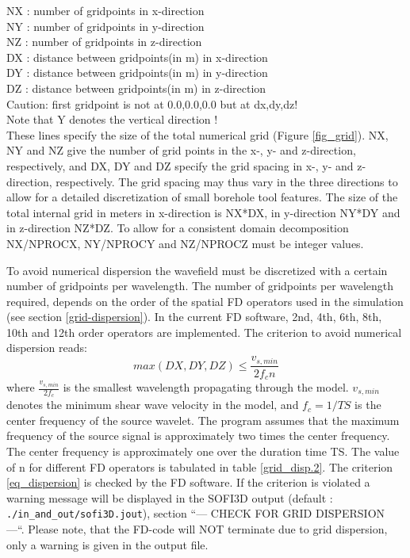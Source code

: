 \documentclass[11pt,onecolumn,oneside]{article}
\begin{document}
NX : number of gridpoints in x-direction\\
NY : number of gridpoints in y-direction\\
NZ : number of gridpoints in z-direction\\
DX : distance between gridpoints(in m) in x-direction\\
DY : distance between gridpoints(in m) in y-direction\\
DZ : distance between gridpoints(in m) in z-direction\\
Caution: first gridpoint is not at {0.0,0.0,0.0} but at {dx,dy,dz}!\\
Note that Y denotes the vertical direction !\\


These lines specify the size of the total numerical grid (Figure  \ref{fig_grid}). NX, NY and NZ give the number of grid points in the x-, y- and z-direction, respectively, and DX, DY and DZ
specify the grid spacing in x-, y- and z-direction, respectively. The grid spacing may thus vary in the three directions to allow for a detailed discretization of small borehole tool features.
The size of the total internal grid in meters in x-direction is NX*DX, in y-direction NY*DY  and in z-direction NZ*DZ. To allow for a consistent domain decomposition NX/NPROCX, NY/NPROCY and NZ/NPROCZ must be integer values.

To avoid numerical dispersion the wavefield must be discretized with a certain number of gridpoints per wavelength. The number of gridpoints per wavelength required, depends on the order of the spatial
FD operators used in the simulation (see section \ref{grid-dispersion}). In the current FD software, 2nd, 4th, 6th, 8th, 10th and 12th order operators are implemented. The criterion to avoid numerical dispersion reads:
\begin{equation}
max(DX,DY,DZ)\le\frac{v_{s,min}}{2 f_c n} \label{eq_dispersion}
\end{equation}
where $\frac{v_{s,min}}{2 f_c}$ is the smallest wavelength propagating through the model. $v_{s,min}$ denotes the minimum shear wave velocity in the model, and $f_c=1/TS$ is the center frequency of the source wavelet. The program assumes that the maximum frequency of the source signal is approximately two times the center frequency. The center frequency is approximately one over the duration time TS. The value of n for different FD operators is tabulated in table \ref{grid_disp.2}. The criterion \ref{eq_dispersion} is checked by the FD software. If the criterion is violated a warning message will be displayed in the SOFI3D output (default :  \lstinline{./in_and_out/sofi3D.jout}), section ``--- CHECK FOR GRID DISPERSION ---``. Please note, that the FD-code will NOT terminate due to grid dispersion, only a warning is given in the output file.
\end{document}
